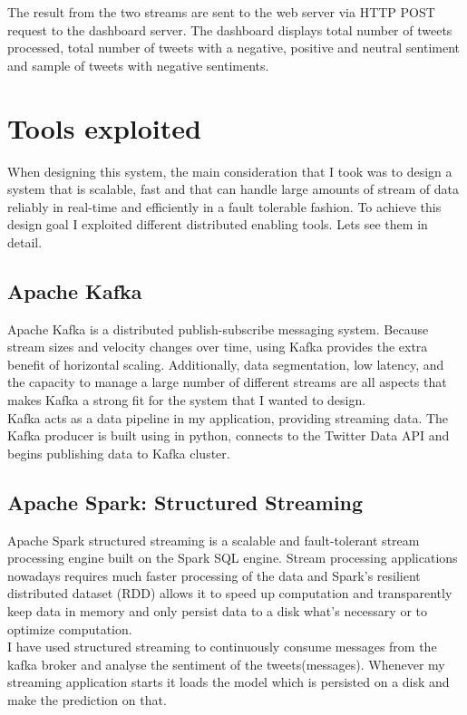 \documentclass[12pt,a4paper]{report}
\begin{document}
The result from the two streams are sent to the web server via  HTTP POST request to the dashboard server. The dashboard displays total number of tweets processed, total number of tweets with a negative, positive and neutral sentiment and sample of tweets with negative sentiments.

\chapter{Tools exploited}
When designing this system, the main consideration that I took was to design a system that is scalable, fast and that can handle large amounts of stream of data reliably in real-time and efficiently in a fault tolerable fashion. To achieve this design goal I exploited different distributed enabling tools. Lets see them in detail.

\section{Apache Kafka}
Apache Kafka is a distributed  publish-subscribe messaging system. Because stream sizes and velocity changes over time, using Kafka provides the extra benefit of horizontal scaling. Additionally, data segmentation, low latency, and the capacity to manage a large number of different streams are all aspects that makes Kafka a strong fit for the system that I wanted to design. \\

Kafka acts as a data pipeline in my application, providing streaming data. The Kafka producer is built using in python, connects to the Twitter Data API and begins publishing data to Kafka cluster.

\section{Apache Spark: Structured Streaming}

Apache Spark structured streaming is a scalable and fault-tolerant stream processing engine built on the Spark SQL engine. Stream processing applications nowadays requires much faster processing of the data and Spark's resilient distributed dataset (RDD) allows it to speed up computation and transparently keep data in memory and only persist data to a disk what's necessary or to optimize computation.\\

I have used structured streaming to continuously consume messages from the kafka broker and analyse the sentiment of the tweets(messages). Whenever my streaming application starts it loads the model which is persisted on a disk and make the prediction on that.\\
\end{document}
